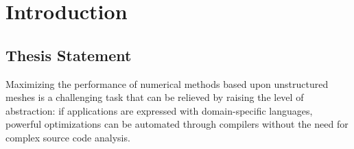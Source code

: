 \chapter{Introduction}

\section{Thesis Statement}



Maximizing the performance of numerical methods based upon unstructured meshes is a challenging task that can be relieved by raising the level of abstraction: if applications are expressed with domain-specific languages, powerful optimizations can be automated through compilers without the need for complex source code analysis. 


